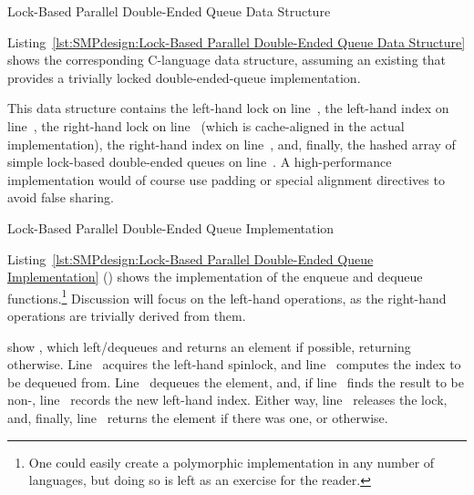 \begin{listing}[tbp]

\caption{Lock-Based Parallel Double-Ended Queue Data Structure}
\label{lst:SMPdesign:Lock-Based Parallel Double-Ended Queue Data Structure}
\end{listing}

Listing~\ref{lst:SMPdesign:Lock-Based Parallel Double-Ended Queue Data Structure}
shows the corresponding C-language data structure, assuming an
existing  that provides a trivially locked
double-ended-queue implementation.
\begin{fcvref}
This data structure contains the left-hand lock on line~,
the left-hand index on line~, the right-hand lock on line~
(which is cache-aligned in the actual implementation),
the right-hand index on line~, and, finally, the hashed array
of simple lock-based double-ended queues on line~.
A high-performance implementation would of course use padding or special
alignment directives to avoid false sharing.
\end{fcvref}

\begin{listing}[tbp]

\caption{Lock-Based Parallel Double-Ended Queue Implementation}
\label{lst:SMPdesign:Lock-Based Parallel Double-Ended Queue Implementation}
\end{listing}

Listing~\ref{lst:SMPdesign:Lock-Based Parallel Double-Ended Queue Implementation}
()
shows the implementation of the enqueue and dequeue functions.\footnote{
	One could easily create a polymorphic implementation in any
	number of languages, but doing so is left as an exercise for
	the reader.}
Discussion will focus on the left-hand operations, as the right-hand
operations are trivially derived from them.

\begin{fcvref}
 show ,
which left\-/dequeues and returns
an element if possible, returning  otherwise.
Line~ acquires the left-hand spinlock,
and line~ computes the
index to be dequeued from.
Line~ dequeues the element, and,
if line~ finds the result to be
non-, line~ records the new left-hand index.
Either way, line~ releases the lock, and,
finally, line~ returns
the element if there was one, or  otherwise.
\end{fcvref}

